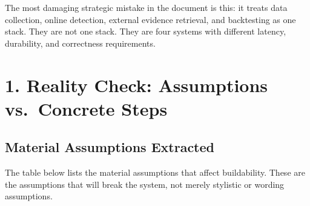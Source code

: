\documentclass[11pt,letterpaper]{article}
\begin{document}
The most damaging strategic mistake in the document is this: it treats data collection, online detection, external evidence retrieval, and backtesting as one stack. They are not one stack. They are four systems with different latency, durability, and correctness requirements.

\section{1. Reality Check: Assumptions vs.\ Concrete Steps}

\subsection{Material Assumptions Extracted}

The table below lists the material assumptions that affect buildability. These are the assumptions that will break the system, not merely stylistic or wording assumptions.
\end{document}
